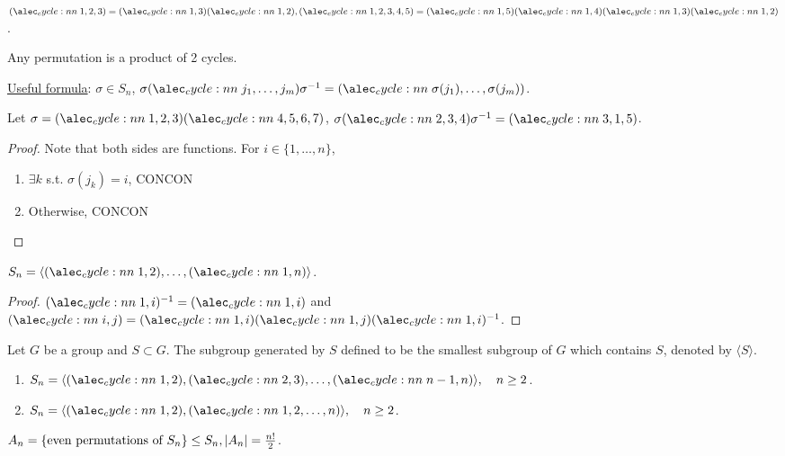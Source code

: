 \begin{example}
  $\cycle{1,2,3} = \cycle{1,3}\cycle{1,2},
  \cycle{1,2,3,4,5} = \cycle{1,5}\cycle{1,4}\cycle{1,3}\cycle{1,2}$.

  Any permutation is a product of 2 cycles.
\end{example}

\underline{Useful formula}: $\sigma \in S_n$,
$\sigma \cycle{j_1, \dots, j_m} \sigma^{-1} =
\cycle{\sigma(j_1),\dots,\sigma(j_m)}$.

\begin{example}
  Let $\sigma = \cycle{1,2,3}\cycle{4,5,6,7}$,
  $\sigma \cycle{2,3,4} \sigma^{-1} = \cycle{3,1,5}$.
\end{example}

\begin{proof}
  Note that both sides are functions. For $i \in \{1,\dots,n\}$,
  \begin{enumerate}
    \item $\exists k$ s.t.  $\sigma(j_k) = i$, CONCON
    \item Otherwise, CONCON
  \end{enumerate}
\end{proof}

\begin{fact}
  $S_n = \langle \cycle{1,2},\dots,\cycle{1,n} \rangle$.
  \begin{proof}
    $\cycle{1,i}^{-1} = \cycle{1,i}$ and
    $\cycle{i,j} = \cycle{1,i}\cycle{1,j}\cycle{1,i}^{-1}$.
  \end{proof}
\end{fact}

\begin{definition}
  Let $G$ be a group and $S \subset G$. The subgroup generated by $S$ defined
  to be the smallest subgroup of $G$ which contains $S$, denoted by
  $\langle S \rangle$.
\end{definition}

\begin{exercise} \mbox{}
  \begin{enumerate}
    \item $S_n = \langle \cycle{1,2},\cycle{2,3},\dots,\cycle{n-1,n} \rangle, \quad n \ge 2$.
    \item $S_n = \langle \cycle{1,2},\cycle{1,2,\dots,n} \rangle, \quad n \ge 2$.
  \end{enumerate}
\end{exercise}

\begin{definition}
  $A_n = \{ \text{even permutations of $S_n$} \} \le S_n,
  \lvert A_n\rvert = \frac{n!}{2}$.
\end{definition}

